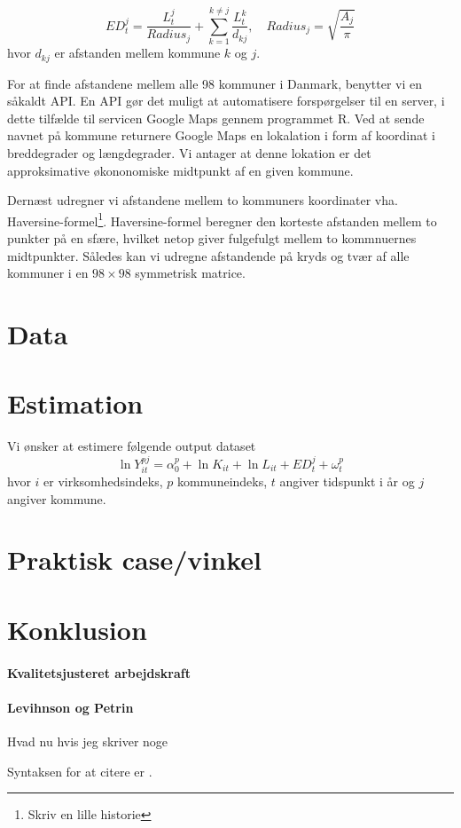 \documentclass[a4paper, 12pt, titlepage]{article}
\begin{document}
\begin{equation}
   ED^j_t = \frac{L^j_t}{Radius_j} + \sum_{k=1}^{k \neq j} \frac{L^k_t}{d_{kj}}, \quad Radius_j = \sqrt{\frac{A_j}{\pi}}
 \end{equation} 
 hvor $d_{kj}$ er afstanden mellem kommune $k$ og $j$. 
 
 
For at finde afstandene mellem alle 98 kommuner i Danmark, benytter vi en såkaldt API. En API gør det muligt at automatisere forspørgelser til en server, i dette tilfælde til servicen Google Maps gennem programmet \textsf{R}. Ved at sende navnet på kommune returnere Google Maps en lokalation i form af koordinat i breddegrader og længdegrader. Vi antager at denne lokation er det approksimative økononomiske midtpunkt af en given kommune. 


Dernæst udregner vi afstandene mellem to kommuners koordinater vha. Haversine-formel\footnote{Skriv en lille historie}. Haversine-formel beregner den korteste afstanden mellem to punkter på en sfære, hvilket netop giver fulgefulgt mellem to kommnuernes midtpunkter. Således kan vi udregne afstandende på kryds og tvær af alle kommuner i en $98\times 98$ symmetrisk matrice. 

\section{Data}
\section{Estimation}
Vi ønsker at estimere følgende output dataset
\begin{equation}
	\ln Y_{it}^{pj} = \alpha^p_0 + \ln K_{it} + \ln L_{it} + ED^j_{t} + \omega^p_{t}
\end{equation}
hvor $i$ er virksomhedsindeks, $p$ kommuneindeks, $t$ angiver tidspunkt i år og $j$ angiver kommune. 
\section{Praktisk case/vinkel}
\section{Konklusion}



\paragraph{Kvalitetsjusteret arbejdskraft}



\paragraph{Levihnson og Petrin}
Hvad nu hvis jeg skriver noge

Syntaksen for at citere er \cite[pp. 211ff.]{melo2009meta}. 






\end{document}
